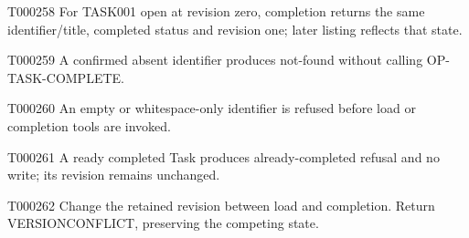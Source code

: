 \documentclass[11pt,a4paper]{article}
\begin{document}
\begin{atlasparagraph}{T000258}
For TASK001 open at revision zero, completion returns the same identifier/title, completed status and revision one; later listing reflects that state.
\end{atlasparagraph}
\par{}\hypertarget{AC-TASK-COMPLETE-MISSING}{}
\begin{atlasparagraph}{T000259}
A confirmed absent identifier produces not-found without calling OP-TASK-COMPLETE.
\end{atlasparagraph}
\par{}\hypertarget{AC-TASK-COMPLETE-INVALID}{}
\begin{atlasparagraph}{T000260}
An empty or whitespace-only identifier is refused before load or completion tools are invoked.
\end{atlasparagraph}
\par{}\hypertarget{AC-TASK-COMPLETE-ALREADY}{}
\begin{atlasparagraph}{T000261}
A ready completed Task produces already-completed refusal and no write; its revision remains unchanged.
\end{atlasparagraph}
\par{}\hypertarget{AC-TASK-COMPLETE-CONFLICT}{}
\begin{atlasparagraph}{T000262}
Change the retained revision between load and completion. Return VERSION\AtlasCharUnderscore{}CONFLICT, preserving the competing state.
\end{atlasparagraph}
\end{document}
